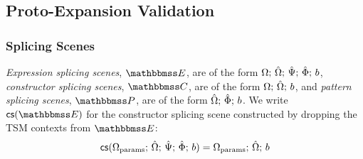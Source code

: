 \subsection{Proto-Expansion Validation}
\subsubsection{Splicing Scenes}
\emph{Expression splicing scenes}, $\escenev$, are of the form $\Omega;\,{\hat\Omega};\,\hat{\Psi};\,\hat\Phi;\,b$, \emph{constructor splicing scenes}, $\cscenev$, are of the form $\Omega;\,{\hat\Omega};\,b$, and \emph{pattern splicing scenes}, $\pscenev$, are of the form ${\hat\Omega};\,\hat\Phi;\,b$. We write $\csfrom{\escenev}$ for the constructor splicing scene constructed by dropping the TSM contexts from $\escenev$:
\[\mathsf{cs}(\Omega_\text{params};\,{\hat\Omega};\,\hat{\Psi};\,\hat\Phi;\,b) = \Omega_\text{params};\,{\hat\Omega};\,b\]

